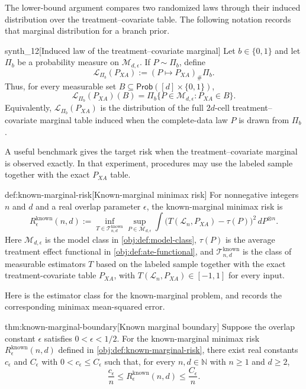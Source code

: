 The lower-bound argument compares two randomized laws through their induced distribution over the treatment--covariate table. The following notation records that marginal distribution for a branch prior.

\begin{definitionv}{synth_12}[Induced law of the treatment--covariate marginal]
Let \(b\in\{0,1\}\) and let \(\Pi_b\) be a probability measure on \(\mathcal M_{d,\epsilon}\). If \(P\sim\Pi_b\), define
\[
\mathcal L_{\Pi_b}(P_{XA})
:=
(P\mapsto P_{XA})_{\#}\Pi_b .
\]
Thus, for every measurable set \(B\subseteq\mathsf{Prob}([d]\times\{0,1\})\),
\[
\mathcal L_{\Pi_b}(P_{XA})(B)
=
\Pi_b\{P\in\mathcal M_{d,\epsilon}:P_{XA}\in B\}.
\]
Equivalently, \(\mathcal L_{\Pi_b}(P_{XA})\) is the distribution of the full \(2d\)-cell treatment--covariate marginal table induced when the complete-data law \(P\) is drawn from \(\Pi_b\).
\end{definitionv}

A useful benchmark gives the target risk when the treatment--covariate marginal is observed exactly. In that experiment, procedures may use the labeled sample together with the exact \(P_{XA}\) table.

\begin{definitionv}{def:known-marginal-risk}[Known-marginal minimax risk]
For nonnegative integers \(n\) and \(d\) and a real overlap parameter \(\epsilon\), the known-marginal minimax risk is
\[
R_\epsilon^{\mathrm{known}}(n,d)
:=
\inf_{T\in\mathcal T^{\mathrm{known}}_{n,d}}
\sup_{P\in\mathcal M_{d,\epsilon}}
\int
\bigl(T(\mathcal L_n,P_{XA})-\tau(P)\bigr)^2
\,dP^{\otimes n}.
\]
Here \(\mathcal M_{d,\epsilon}\) is the model class in \cref{obj:def:model-class}, \(\tau(P)\) is the average treatment effect functional in \cref{obj:def:ate-functional}, and \(\mathcal T^{\mathrm{known}}_{n,d}\) is the class of measurable estimators \(T\) based on the labeled sample together with the exact treatment-covariate table \(P_{XA}\), with \(T(\mathcal L_n,P_{XA})\in[-1,1]\) for every input.
\end{definitionv}

Here  is the estimator class for the known-marginal problem, and  records the corresponding minimax mean-squared error.

\begin{theoremv}{thm:known-marginal-boundary}[Known marginal boundary]
Suppose the overlap constant \(\epsilon\) satisfies \(0<\epsilon<1/2\). For the known-marginal minimax risk \(R_\epsilon^{\mathrm{known}}(n,d)\) defined in \cref{obj:def:known-marginal-risk}, there exist real constants \(c_\epsilon\) and \(C_\epsilon\) with \(0<c_\epsilon\le C_\epsilon\) such that, for every \(n,d\in\mathbb N\) with \(n\ge1\) and \(d\ge2\),
\[
\frac{c_\epsilon}{n}
\le
R_\epsilon^{\mathrm{known}}(n,d)
\le
\frac{C_\epsilon}{n}.
\]
\end{theoremv}

